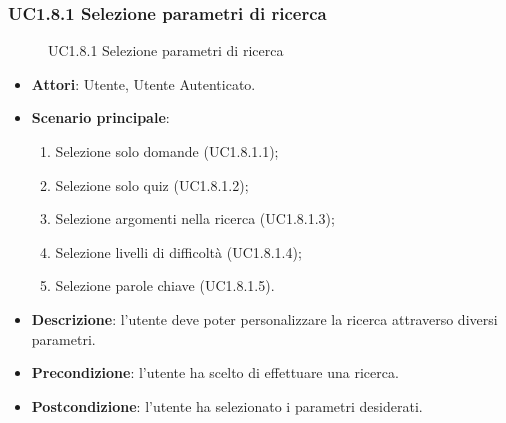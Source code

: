 \subsubsection{UC1.8.1 Selezione parametri di ricerca}
\begin{figure}[H]
\centering
\noindent{}
\caption{UC1.8.1 Selezione parametri di ricerca}
\end{figure}
\begin{itemize}
\item \textbf{Attori}: Utente, Utente Autenticato.
\item \textbf{Scenario principale}:
\begin{enumerate}
\item Selezione solo domande (UC1.8.1.1);
\item Selezione solo quiz (UC1.8.1.2);
\item Selezione argomenti nella ricerca (UC1.8.1.3);
\item Selezione livelli di difficoltà (UC1.8.1.4);
\item Selezione parole chiave (UC1.8.1.5).
\end{enumerate}
\item \textbf{Descrizione}: l'utente deve poter personalizzare la ricerca attraverso diversi parametri.
\item \textbf{Precondizione}: l'utente ha scelto di effettuare una ricerca.
\item \textbf{Postcondizione}: l'utente ha selezionato i parametri desiderati.
\end{itemize}
